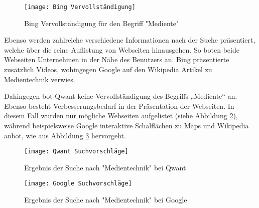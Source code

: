 \begin{figure}[h]
    \centering
    \texttt{[image: Bing Vervollständigung]}
    \caption{Bing Vervollständigung für den Begriff "Mediente"}
    \label{fig:bingvervollstandigung}
\end{figure}

Ebenso werden zahlreiche verschiedene Informationen nach der Suche präsentiert, welche über die reine Auflistung von Webseiten
hinausgehen. So boten beide Webseiten Unternehmen in der Nähe des Benutzers an. Bing präsentierte zusätzlich Videos, wohingegen
Google auf den Wikipedia Artikel zu Medientechnik verwies.

Dahingegen bot Qwant keine Vervollständigung des Begriffs „Mediente“ an. Ebenso besteht Verbesserungsbedarf in der Präsentation
der Webseiten. In diesem Fall wurden nur mögliche Webseiten aufgelistet (siehe Abbildung \ref{fig:qwantvorschlage}), während beispielsweise Google
interaktive Schalflächen zu Maps und Wikipedia anbot, wie aus Abbildung \ref{fig:googlevorschlage} hervorgeht.
\begin{figure}[h]
    \centering
    \texttt{[image: Qwant Suchvorschläge]}
    \caption{Ergebnis der Suche nach "Medientechnik" bei Qwant}
    \label{fig:qwantvorschlage}
\end{figure}

\begin{figure}[h]
    \centering
    \texttt{[image: Google Suchvorschläge]}
    \caption{Ergebnis der Suche nach "Medientechnik" bei Google}
    \label{fig:googlevorschlage}
\end{figure}

